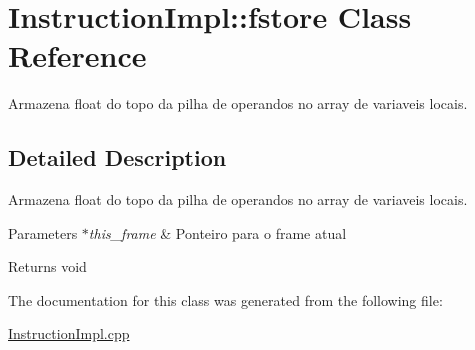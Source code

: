 \hypertarget{class_instruction_impl_1_1fstore}{}\section{Instruction\+Impl\+:\+:fstore Class Reference}
\label{class_instruction_impl_1_1fstore}


Armazena float do topo da pilha de operandos no array de variaveis locais.  




\subsection{Detailed Description}
Armazena float do topo da pilha de operandos no array de variaveis locais. 


\begin{DoxyParams}{Parameters}
{\em $\ast$this\+\_\+frame} & Ponteiro para o frame atual \\
\hline
\end{DoxyParams}
\begin{DoxyReturn}{Returns}
void 
\end{DoxyReturn}


The documentation for this class was generated from the following file\+:\begin{DoxyCompactItemize}
\item 
\hyperlink{_instruction_impl_8cpp}{Instruction\+Impl.\+cpp}\end{DoxyCompactItemize}
